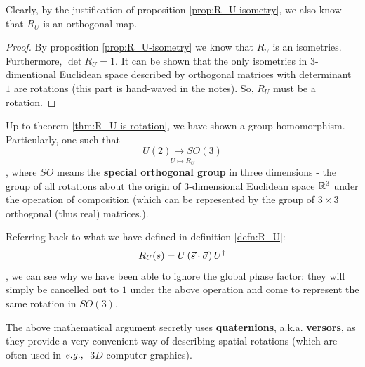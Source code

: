 \documentclass[12pt]{article}
\begin{document}
\begin{proposition}
Clearly, by the justification of proposition \ref{prop:R_U-isometry}, we also know that $R_U$ is an orthogonal map.
\end{proposition}

\begin{theorem}\label{thm:R_U-is-rotation}
\end{theorem}
\begin{proof}
By proposition \ref{prop:R_U-isometry} we know that $R_U$ is an isometries. Furthermore, $\det{R_U} = 1$. It can be shown that the only isometries in $3$-dimentional Euclidean space described by orthogonal matrices with determinant $1$ are rotations (this part is hand-waved in the notes). So, $R_U$ must be a rotation.
\end{proof}

\begin{theorem}
Up to theorem \ref{thm:R_U-is-rotation}, we have shown a group homomorphism. Particularly, one such that $$
\underset{U\mapsto R_U}{U(2) \rightarrow SO(3)}
$$, where $SO$ means the \textbf{special orthogonal group} in three dimensions - the group of all rotations about the origin of $3$-dimensional Euclidean space ${\mathbb R}^3$ under the operation of composition (which can be represented by the group of $3\times 3$ orthogonal (thus real) matrices.).
\end{theorem}

\begin{remark}
Referring back to what we have defined in definition \ref{defn:R_U}: $$
R_U(s) = U\left(\vec{s}\cdot \vec{\sigma}\right)U^\dag
$$, we can see why we have been able to ignore the global phase factor: they will simply be cancelled out to $1$ under the above operation and come to represent the same rotation in $SO(3)$.
\end{remark}

\begin{remark}
The above mathematical argument secretly uses \textbf{quaternions}, a.k.a. \textbf{versors}, as they provide a very convenient way of describing spatial rotations (which are often used in ${\it e.g.,\ }$ $3D$ computer graphics).
\end{remark}
\end{document}
